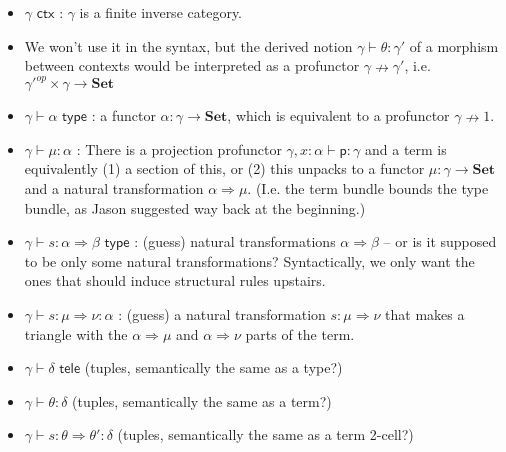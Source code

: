 \documentclass[10pt]{article}
\newcommand{\yields}{\vdash}
\newcommand{\ctx}{\,\,\mathsf{ctx}}
\newcommand{\type}{\,\,\mathsf{type}}
\newcommand{\tele}{\,\,\mathsf{tele}}
\newcommand\Set[0]{\ensuremath{\textbf{Set}}}
\begin{document}
\begin{itemize}
\item $\gamma \ctx$ : $\gamma$ is a finite inverse category.  

\item We won't use it in the syntax, but the derived notion $\gamma
  \yields \theta : \gamma'$ of a morphism between contexts would be
  interpreted as a profunctor $\gamma \nrightarrow \gamma'$,
  i.e. $\gamma'^{op} \times \gamma \to \Set$

\item $\gamma \yields \alpha \type$ : a functor $\alpha : \gamma \to
  \Set$, which is equivalent to a profunctor $\gamma \nrightarrow 1$.  

\item $\gamma \yields \mu : \alpha$ : There is a projection profunctor
  $\gamma,x:\alpha \yields \mathsf{p} : \gamma$ and a term is
  equivalently (1) a section of this, or (2) this unpacks to a functor
  $\mu : \gamma \to \Set$ and a natural transformation $\alpha
  \Rightarrow \mu$.  (I.e. the term bundle bounds the type bundle, as
  Jason suggested way back at the beginning.)

\item $\gamma \yields s : \alpha \Rightarrow \beta \type$ : (guess)
  natural transformations $\alpha \Rightarrow \beta$ -- or is it
  supposed to be only some natural transformations?  Syntactically, we
  only want the ones that should induce structural rules upstairs.

\item $\gamma \yields s : \mu \Rightarrow \nu : \alpha$ : (guess) a
  natural transformation $s : \mu \Rightarrow \nu$ that makes a triangle
  with the $\alpha \Rightarrow \mu$ and $\alpha \Rightarrow \nu$ parts
  of the term.

\item $\gamma \yields \delta \tele$ (tuples, semantically the same as
  a type?)
\item $\gamma \yields \theta : \delta$ (tuples, semantically the same as
  a term?)
\item $\gamma \yields s : \theta \Rightarrow \theta' : \delta$ (tuples,
  semantically the same as a term 2-cell?)
\end{itemize}
\end{document}
